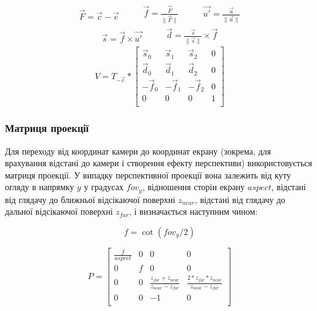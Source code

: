 \begin{equation}
  \begin{split}
    \vec{F} = \vec{c} - \vec{e}
  \end{split}
  \quad\quad
  \begin{split}
    \vec{f} = \frac{\vec F}{\|\vec{F}\|}
  \end{split}
  \quad\quad
  \begin{split}
    \vec{u'} = \frac{\vec u}{\|\vec{u}\|}
  \end{split}
\end{equation}
\begin{equation}
  \begin{split}
    \vec{s} = \vec{f} \times \vec{u'}
  \end{split}
  \quad\quad
  \begin{split}
    \vec{d} = \frac{\vec s}{\|\vec{s}\|} \times \vec{f}
  \end{split}
\end{equation}
\begin{equation}
  V = T_{-\vec{e}} * \begin{bmatrix}
    \vec{s}_0 & \vec{s}_1 & \vec{s}_2 & 0 \\
    \vec{d}_0 & \vec{d}_1 & \vec{d}_2 & 0 \\
    -\vec{f}_0 & -\vec{f}_1 & -\vec{f}_2 & 0 \\
    0 & 0 & 0 & 1 \\
  \end{bmatrix}
\end{equation}

\subsubsection{Матриця проекції}

Для переходу від координат камери до координат екрану (зокрема, для врахування відстані до камери і створення ефекту перспективи) використовується матриця проекції. У випадку перспективної проекції вона залежить від куту огляду в напрямку $y$ у градусах $\mathit{fov_y}$, відношення сторін екрану $\mathit{aspect}$, відстані від глядачу до ближньої відсікаючої поверхні $\mathit{z_{near}}$, відстані від глядачу до дальної відсікаючої поверхні $z_{far}$, і визначається наступним чином:

\begin{equation}
  f = \operatorname{cot}(\mathit{fov_y} / 2)
\end{equation}

\begin{equation}
  P = \begin{bmatrix}
    \frac{f}{\mathit{aspect}} & 0 & 0 & 0 \\
    0 & f & 0 & 0 \\
    0 & 0 & \frac{\mathit{z_{far}}+\mathit{z_{near}}}{\mathit{z_{near}}-\mathit{z_{far}}}
      & \frac{2*\mathit{z_{far}}*\mathit{z_{near}}}{\mathit{z_{near}}-\mathit{z_{far}}} \\
    0 & 0 & -1 & 0 \\
  \end{bmatrix}
\end{equation}


